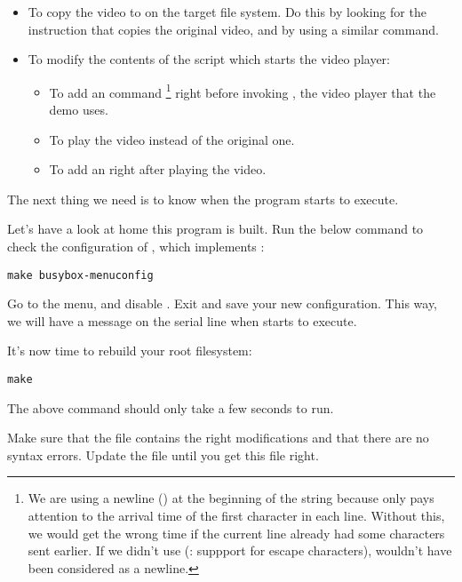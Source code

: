 \begin{itemize}
\item To copy the  video to  on the target
      file system. Do this by looking for the instruction that copies the
      original video, and by using a similar command.
\item To modify the contents of the  script
      which starts the video player:
      \begin{itemize}
      \item To add an  command
	    \footnote{We are using a newline (\code{\n}) at the
beginning of the string because  only pays attention to
the arrival time of the first character in each line. Without this, we
would get the wrong time if the current line already had some
characters sent earlier. If we didn't use  (:
suppport for escape characters), \code{\n} wouldn't have been considered
as a newline.}
            right before invoking , the video player that the demo
	    uses.
      \item To play the  video instead of the original
  	    one.
      \item To add an  right after
 	    playing the video.
      \end{itemize}
\end{itemize}

The next thing we need is to know when the  program starts to
execute.

Let's have a look at home this program is built. Run the below command
to check the configuration of , which implements
:

\begin{verbatim}
make busybox-menuconfig
\end{verbatim}

Go to the  menu, and disable . Exit and save your new configuration. This way, we will have
a message on the serial line when  starts to execute.

It's now time to rebuild your root filesystem:
\begin{verbatim}
make
\end{verbatim}

The above command should only take a few seconds to run.

Make sure that the  file
contains the right modifications and that there are no syntax errors.
Update the  file until
you get this file right.

